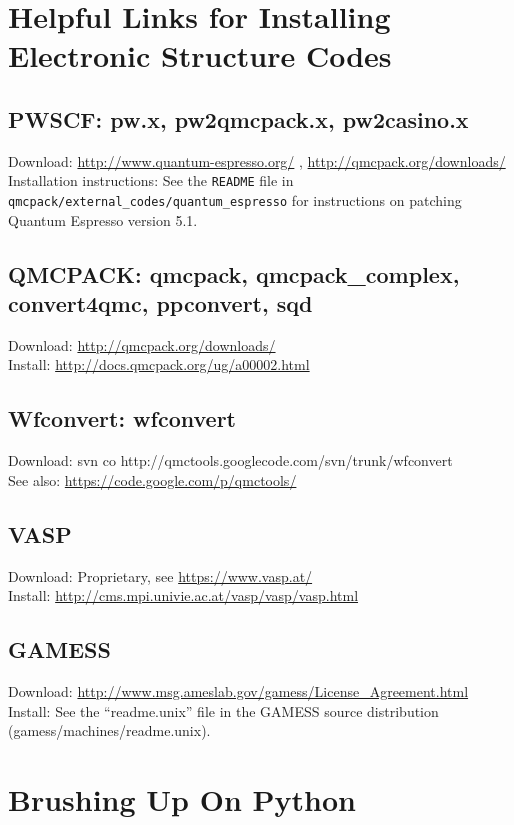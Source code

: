 \documentclass[oneside,11pt]{memoir}
\numberwithin{equation}{section}
\begin{document}
\section{Helpful Links for Installing Electronic Structure Codes} \label{sec:install_code}
\subsection{PWSCF: pw.x, pw2qmcpack.x, pw2casino.x}
  Download: \url{http://www.quantum-espresso.org/} , \url{http://qmcpack.org/downloads/} \\
  Installation instructions: See the \texttt{README} file in \texttt{qmcpack/external\_codes/quantum\_espresso} for instructions on patching Quantum Espresso version 5.1.

\subsection{QMCPACK: qmcpack, qmcpack\_complex, convert4qmc, ppconvert, sqd}
  Download: \url{http://qmcpack.org/downloads/}\\ 
  Install: \url{http://docs.qmcpack.org/ug/a00002.html}

\subsection{Wfconvert: wfconvert}
  Download: svn co http://qmctools.googlecode.com/svn/trunk/wfconvert \\
  See also: \url{https://code.google.com/p/qmctools/}

\subsection{VASP}
  Download: Proprietary, see \url{https://www.vasp.at/} \\
  Install: \url{http://cms.mpi.univie.ac.at/vasp/vasp/vasp.html}

\subsection{GAMESS}
  Download: \url{http://www.msg.ameslab.gov/gamess/License_Agreement.html}
  Install: See the ``readme.unix'' file in the GAMESS source distribution (gamess/machines/readme.unix).


\section{Brushing Up On Python}\label{sec:learn_python}
\end{document}

